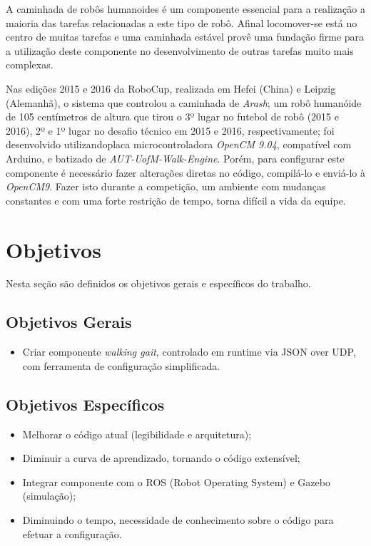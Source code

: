 A caminhada de robôs humanoides é um componente essencial para a realização 
a maioria das tarefas relacionadas a este tipo de robô. Afinal locomover-se
está no centro de muitas tarefas e uma caminhada estável provê uma fundação
firme para a utilização deste componente no desenvolvimento de outras tarefas
muito mais complexas.


Nas edições 2015 e 2016 da RoboCup, realizada em Hefei (China) e Leipzig (Alemanhã),
o sistema que controlou a caminhada de \textit{Arash}; um robô humanóide de
105 centímetros de altura que tirou o 3º lugar no futebol de robô (2015 e 2016),
2º e 1º lugar no desafio técnico em 2015 e 2016, respectivamente; foi desenvolvido
utilizandoplaca microcontroladora \textit{OpenCM 9.04}, compatível com Arduino,
e batizado de \textit{AUT-UofM-Walk-Engine}. Porém, para configurar este componente
é necessário fazer alterações diretas no código, compilá-lo e enviá-lo à \textit{OpenCM9}.
Fazer isto durante a competição, um ambiente com mudanças constantes e com uma forte
restrição de tempo, torna difícil a vida da equipe.

\section{Objetivos}

Nesta seção são definidos os objetivos gerais e específicos do trabalho.

\subsection{Objetivos Gerais}

\begin{itemize}
	\item Criar componente \textit{walking gait}, controlado em runtime via JSON over UDP, com ferramenta de configuração simplificada.
\end{itemize}

\subsection{Objetivos Específicos} 

\begin{itemize}
	\item Melhorar o código atual (legibilidade e arquitetura);
	\item Diminuir a curva de aprendizado, tornando o código extensível;
	\item Integrar componente com o ROS (Robot Operating System) e Gazebo (simulação);
	\item Diminuindo o tempo, necessidade de conhecimento sobre o código para efetuar a configuração.
\end{itemize}

